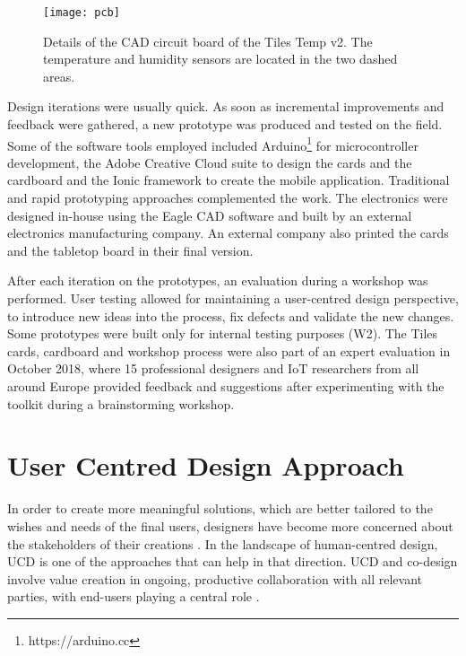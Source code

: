 \begin{figure}[ptb]
    \centering 
	\texttt{[image: pcb]}
	\caption{Details of the CAD circuit board of the Tiles Temp v2. The temperature and humidity sensors are located in the two dashed areas.}
	\label{fig:pcb}
\end{figure}

Design iterations were usually quick. As soon as incremental improvements and feedback were gathered, a new prototype was produced and tested on the field. Some of the software tools employed included Arduino\footnote{https://arduino.cc} for microcontroller development, the Adobe Creative Cloud suite to design the cards and the cardboard and the Ionic framework to create the mobile application.
Traditional and rapid prototyping approaches complemented the work. The electronics were designed in-house using the Eagle CAD software and built by an external electronics manufacturing company. An external company also printed the cards and the tabletop board in their final version.

After each iteration on the prototypes, an evaluation during a workshop was performed. User testing allowed for maintaining a user-centred design perspective, to introduce new ideas into the process, fix defects and validate the new changes. Some prototypes were built only for internal testing purposes (W2). The Tiles cards, cardboard and workshop process were also part of an expert evaluation in October 2018, where 15 professional designers and IoT researchers from all around Europe provided feedback and suggestions after experimenting with the toolkit during a brainstorming workshop.


\section{User Centred Design Approach}

In order to create more meaningful solutions, which are better tailored to the wishes and needs of the final users, designers have become more concerned about the stakeholders of their creations \autocite{sanders_co-creation_2008}. In the landscape of human-centred design, UCD is one of the approaches that can help in that direction.
UCD and co-design involve value creation in ongoing, productive collaboration with all relevant parties, with end-users playing a central role \autocite{jansen_7_2017}.

